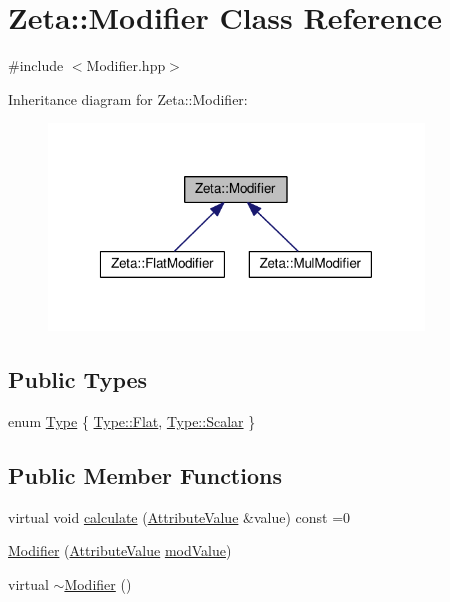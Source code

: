 \hypertarget{classZeta_1_1Modifier}{\section{Zeta\+:\+:Modifier Class Reference}
\label{classZeta_1_1Modifier}
}


{\ttfamily \#include $<$Modifier.\+hpp$>$}



Inheritance diagram for Zeta\+:\+:Modifier\+:\nopagebreak
\begin{figure}[H]
\begin{center}
\leavevmode
\includegraphics[width=283pt]{classZeta_1_1Modifier__inherit__graph}
\end{center}
\end{figure}
\subsection*{Public Types}
\begin{DoxyCompactItemize}
\item 
enum \hyperlink{classZeta_1_1Modifier_a0081811b87d3bc0fc672b9773951d0b7}{Type} \{ \hyperlink{classZeta_1_1Modifier_a0081811b87d3bc0fc672b9773951d0b7a745e3db6a7ffd50e1a72b39482f0882d}{Type\+::\+Flat}, 
\hyperlink{classZeta_1_1Modifier_a0081811b87d3bc0fc672b9773951d0b7af60357a8d17e45793298323f1b372a74}{Type\+::\+Scalar}
 \}
\end{DoxyCompactItemize}
\subsection*{Public Member Functions}
\begin{DoxyCompactItemize}
\item 
virtual void \hyperlink{classZeta_1_1Modifier_a43bf640dc0ed6404e42469f073759b32}{calculate} (\hyperlink{namespaceZeta_ab5947f98c0ab6302b51f8c6e93ec5581}{Attribute\+Value} \&value) const =0
\item 
\hyperlink{classZeta_1_1Modifier_a9fe83840f871853e8f572a60a1e3f868}{Modifier} (\hyperlink{namespaceZeta_ab5947f98c0ab6302b51f8c6e93ec5581}{Attribute\+Value} \hyperlink{classZeta_1_1Modifier_ae9685e22722b0aaae9edd1a074a6251d}{mod\+Value})
\item 
virtual \hyperlink{classZeta_1_1Modifier_a45edbe90d1c8b4a24776d5a61a41e756}{$\sim$\+Modifier} ()
\end{DoxyCompactItemize}
